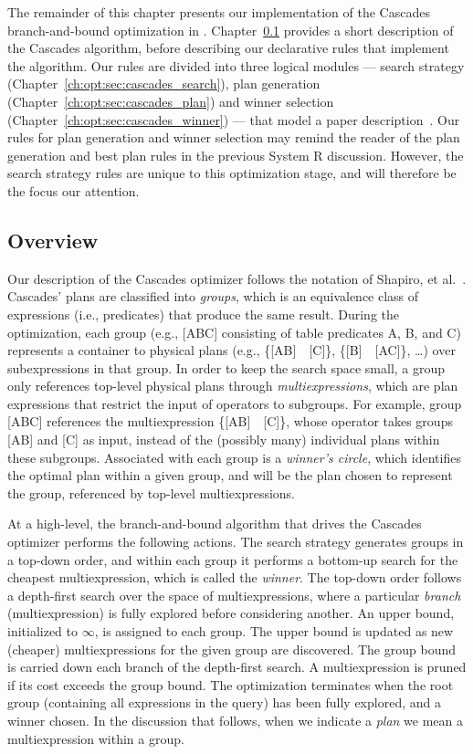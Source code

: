 The remainder of this chapter presents our implementation of the Cascades
branch-and-bound optimization in \OVERLOG.  Chapter~\ref{ch:opt:sec:overview}
provides a short description of the Cascades algorithm, before describing our
declarative rules that implement the algorithm.  Our rules are divided into
three logical modules --- search strategy
(Chapter~\ref{ch:opt:sec:cascades_search}), plan generation
(Chapter~\ref{ch:opt:sec:cascades_plan}) and winner selection
(Chapter~\ref{ch:opt:sec:cascades_winner}) --- that model a paper
description~\cite{Shapiro-opt}.  Our rules for plan generation and winner
selection may remind the reader of the plan generation and best plan rules in
the previous System R discussion.  However, the search strategy rules are
unique to this optimization stage, and will therefore be the focus our
attention.

\subsection{Overview}
\label{ch:opt:sec:overview}

Our description of the Cascades optimizer follows the notation of Shapiro, et
al.~\cite{Shapiro-opt}.  Cascades' plans are classified into {\em groups},
which is an equivalence class of expressions (i.e., predicates) that produce
the same result.  During the optimization, each group (e.g., [ABC] consisting
of table predicates A, B, and C) represents a container to physical plans
(e.g., \{[AB]~~[C]\}, \{[B]~~[AC]\},
\ldots) over subexpressions in that group.  In order to keep the search space
small, a group only references top-level physical plans through {\em
multiexpressions}, which are plan expressions that restrict the input of
operators to subgroups.  For example, group [ABC] references the
multiexpression \{[AB]~~[C]\}, whose 
operator takes groups [AB] and [C] as input, instead of the (possibly many)
individual plans within these subgroups.
Associated with each group is a {\em winner's circle}, which identifies the
optimal plan within a given group, and will be the plan chosen to represent the
group, referenced by top-level multiexpressions.  

At a high-level, the branch-and-bound algorithm that drives the Cascades
optimizer performs the following actions.  The search strategy generates groups
in a top-down order, and within each group it performs a bottom-up search for
the cheapest multiexpression, which is called the {\em winner}.  The top-down
order follows a depth-first search over the space of multiexpressions, where a
particular {\em branch} (multiexpression) is fully explored before considering
another.  An upper bound, initialized to $\infty$, is assigned to each group.
The upper bound is updated as new (cheaper) multiexpressions for the given
group are discovered.  The group bound is carried down each branch of the
depth-first search.  A multiexpression is pruned if its cost exceeds the group
bound.  The optimization terminates when the root group (containing all
expressions in the query) has been fully explored, and a winner chosen.  In the
discussion that follows, when we indicate a {\em plan} we mean a
multiexpression within a group.

